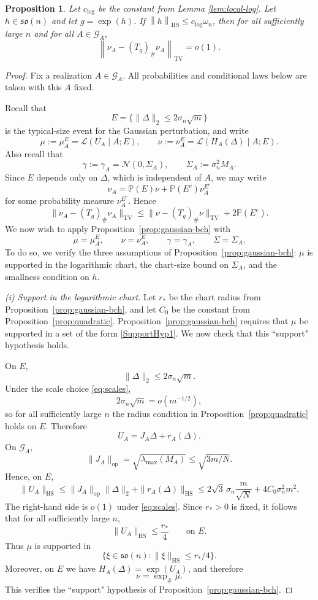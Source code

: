 \documentclass[11pt, reqno]{amsart}
\numberwithin{equation}{section}
\newtheorem{proposition}{Proposition}
\theoremstyle{remark}
\newcommand{\Prob}{\mathbb{P}}
\newcommand{\1}{\mathbf{1}}
\newcommand{\so}{\mathfrak{so}}
\newcommand{\HS}{\mathrm{HS}}
\newcommand{\op}{\mathrm{op}}
\newcommand{\Law}{\mathcal{L}}
\newcommand{\TV}{\mathrm{TV}}
\newcommand{\norm}[1]{\left\lVert #1\right\rVert}
\begin{document}
\begin{proposition}
\label{prop:block-translate}
Let $c_{\log}$ be the constant from Lemma \ref{lem:local-log}. Let $h\in\so(n)$ and let $g=\exp(h)$.  If $\norm{h}_{\HS}\le c_{\log}\omega_n$, then
for all sufficiently large $n$ and for all $A\in \mathcal G_A$,
\begin{equation} \label{eqn:tvo(1)bd}
\norm{\nu_A-(T_g)_\#\nu_A}_{\TV}=o(1).
\end{equation}
\end{proposition}
\begin{proof}
Fix a realization $A\in \mathcal G_A$. All probabilities and conditional laws
below are taken with this $A$ fixed.

Recall that
\[
E=\{\|\Delta\|_2\le 2\sigma_n\sqrt m\}
\]
is the typical-size event for the Gaussian perturbation, and write
\[
\mu:=\mu_A^E=\Law(U_A\mid A;E),
\qquad
\nu:=\nu_A^E=\Law(H_A(\Delta)\mid A;E).
\]
Also recall that
\[
\gamma:=\gamma_A=\mathcal N(0,\Sigma_A),
\qquad
\Sigma_A:=\sigma_n^2M_A.
\]
Since $E$ depends only on $\Delta$, which is independent of $A$, we may write
\[
\nu_A=\Prob(E)\nu+\Prob(E^c)\nu_A^{E^c}
\]
for some probability measure $\nu_A^{E^c}$. Hence
\begin{equation}
\label{eq:block-decomposition}
\|\nu_A-(T_g)_\#\nu_A\|_{\TV}
\le
\|\nu-(T_g)_\#\nu\|_{\TV}
+
2\Prob(E^c).
\end{equation}
We now wish to apply Proposition~\ref{prop:gaussian-bch} with
\[
\mu=\mu_A^E,
\qquad
\nu=\nu_A^E,
\qquad
\gamma=\gamma_A,
\qquad
\Sigma=\Sigma_A.
\]
To do so, we verify the three assumptions of Proposition~\ref{prop:gaussian-bch}: $\mu$ is supported in the logarithmic chart, the chart-size bound on $\Sigma_A$, and the smallness condition on $h$.

\smallskip
\noindent
\emph{(i) Support in the logarithmic chart.}
Let $r_\ast$ be the chart radius from Proposition~\ref{prop:gaussian-bch}, and let
$C_0$ be the constant from Proposition~\ref{prop:quadratic}. Proposition~\ref{prop:gaussian-bch} requires that $\mu$ be supported in a set of the form \eqref{SupportHyp1}. We now check that this ``support" hypothesis holds.

On $E$,
\[
\|\Delta\|_2\le 2\sigma_n\sqrt m.
\]
Under the scale choice \eqref{eq:scales},
\[
2\sigma_n\sqrt m=o(m^{-1/2}),
\]
so for all sufficiently large $n$ the radius condition in
Proposition~\ref{prop:quadratic} holds on $E$. Therefore
\[
U_A=J_A\Delta+r_A(\Delta).
\]
On $\mathcal G_A$,
\[
\|J_A\|_{\op}
=
\sqrt{\lambda_{\max}(M_A)}
\le
\sqrt{3m/N}.
\]
Hence, on $E$,
\[
\|U_A\|_{\HS}
\le
\|J_A\|_{\op}\|\Delta\|_2+\|r_A(\Delta)\|_{\HS}
\le
2\sqrt3\,\sigma_n\frac{m}{\sqrt N}
+
4C_0\sigma_n^2m^2.
\]
The right-hand side is $o(1)$ under \eqref{eq:scales}. Since $r_\ast>0$ is fixed,
it follows that for all sufficiently large $n$,
\[
\|U_A\|_{\HS}\le \frac{r_\ast}{4}
\qquad\text{on }E.
\]
Thus $\mu$ is supported in
\[
\{\xi\in\so(n):\|\xi\|_{\HS}\le r_\ast/4\}.
\]
Moreover, on $E$ we have $H_A(\Delta)=\exp(U_A)$, and therefore
\[
\nu=\exp_\#\mu.
\]
This verifies the ``support" hypothesis of Proposition~\ref{prop:gaussian-bch}.


\end{proof}
\end{document}
